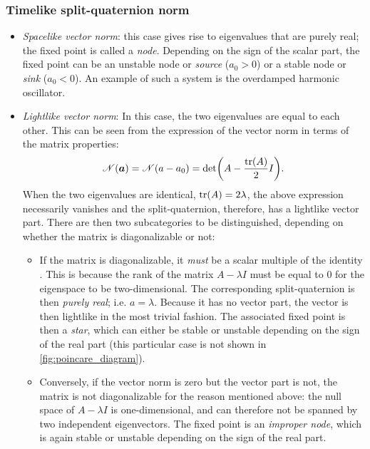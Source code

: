 \subsubsection*{Timelike split-quaternion norm}
    \begin{itemize}
        \item[\circled{4}] \emph{Spacelike vector norm}: this case gives rise to eigenvalues that are purely real; the fixed point is called a \emph{node}. Depending on the sign of the scalar part, the fixed point can be an unstable node or \emph{source} (\(a_0 > 0\)) or a stable node or \emph{sink} (\(a_0 < 0\)). An example of such a system is the overdamped harmonic oscillator.
        \item[\circled{5}] \emph{Lightlike vector norm}: In this case, the two eigenvalues are equal to each other. This can be seen from the expression of the vector norm in terms of the matrix properties: 
            \begin{equation}
                 \mathscr{N}(\vec{a}) = \mathscr{N}(a - a_0) = \det(A - \frac{\trace(A)}{2}I).
            \end{equation}
        When the two eigenvalues are identical, \(\trace(A) = 2\lambda\), the above expression necessarily vanishes and the split-quaternion, therefore, has a lightlike vector part. There are then two subcategories to be distinguished, depending on whether the matrix is diagonalizable or not:
        \begin{itemize}
            \item If the matrix is diagonalizable, it \emph{must} be a scalar multiple of the identity \cite{Edwards2018}. This is because the rank of the matrix \( A - \lambda I\) must be equal to 0 for the eigenspace to be two-dimensional. The corresponding split-quaternion is then \emph{purely real}; i.e. \(a = \lambda\). Because it has no vector part, the vector is then lightlike in the most trivial fashion. The associated fixed point is then a \emph{star}, which can either be stable or unstable depending on the sign of the real part (this particular case is not shown in \cref{fig:poincare_diagram}). 
            \item Conversely, if the vector norm is zero but the vector part is not, the matrix is not diagonalizable for the reason mentioned above: the null space of \( A - \lambda I\) is one-dimensional, and can therefore not be spanned by two independent eigenvectors. The fixed point is an \emph{improper node}, which is again stable or unstable depending on the sign of the real part.

\end{itemize}
\end{itemize}
